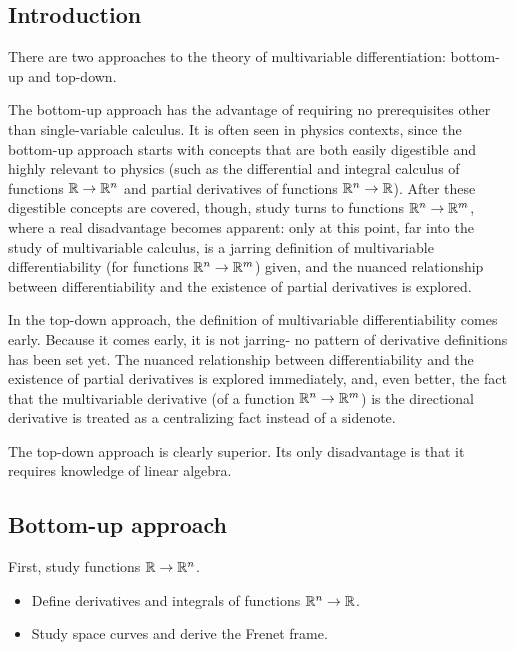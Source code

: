 \subsection*{Introduction}

There are two approaches to the theory of multivariable differentiation: bottom-up and top-down.

The bottom-up approach has the advantage of requiring no prerequisites other than single-variable calculus. It is often seen in physics contexts, since the bottom-up approach starts with concepts that are both easily digestible and highly relevant to physics (such as the differential and integral calculus of functions $\mathbb{R} \rightarrow \mathbb{R}^n$ and partial derivatives of functions $\mathbb{R}^n \rightarrow \mathbb{R}$). After these digestible concepts are covered, though, study turns to functions $\mathbb{R}^n \rightarrow \mathbb{R}^m$, where a real disadvantage becomes apparent: only at this point, far into the study of multivariable calculus, is a jarring definition of multivariable differentiability (for functions $\mathbb{R}^n \rightarrow \mathbb{R}^m$) given, and the nuanced relationship between differentiability and the existence of partial derivatives is explored.

In the top-down approach, the definition of multivariable differentiability comes early. Because it comes early, it is not jarring- no pattern of derivative definitions has been set yet. The nuanced relationship between differentiability and the existence of partial derivatives is explored immediately, and, even better, the fact that the multivariable derivative (of a function $\mathbb{R}^n \rightarrow \mathbb{R}^m$) is the directional derivative is treated as a centralizing fact instead of a sidenote. 

The top-down approach is clearly superior. Its only disadvantage is that it requires knowledge of linear algebra.

\subsection*{Bottom-up approach}

First, study functions $\mathbb{R} \rightarrow \mathbb{R}^n$.

\begin{itemize}
    \item Define derivatives and integrals of functions $\mathbb{R}^n \rightarrow \mathbb{R}$. 
    \item Study space curves and derive the Frenet frame.
\end{itemize}

